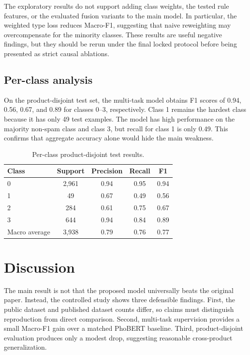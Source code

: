 \documentclass[runningheads]{llncs}
\begin{document}
The exploratory results do not support adding class weights, the tested rule features, or the evaluated fusion variants to the main model. In particular, the weighted type loss reduces Macro-F1, suggesting that naive reweighting may overcompensate for the minority classes. These results are useful negative findings, but they should be rerun under the final locked protocol before being presented as strict causal ablations.

\subsection{Per-class analysis}
On the product-disjoint test set, the multi-task model obtains F1 scores of 0.94, 0.56, 0.67, and 0.89 for classes 0--3, respectively. Class 1 remains the hardest class because it has only 49 test examples. The model has high performance on the majority non-spam class and class 3, but recall for class 1 is only 0.49. This confirms that aggregate accuracy alone would hide the main weakness.

\begin{table}[!b]
\caption{Per-class product-disjoint test results.}
\label{tab:perclass}
\centering
\small
\begin{tabularx}{0.95\linewidth}{X c c c c}
\toprule
Class & Support & Precision & Recall & F1 \\
\midrule
0 & 2,961 & 0.94 & 0.95 & 0.94 \\
1 & 49 & 0.67 & 0.49 & 0.56 \\
2 & 284 & 0.61 & 0.75 & 0.67 \\
3 & 644 & 0.94 & 0.84 & 0.89 \\
\midrule
Macro average & 3,938 & 0.79 & 0.76 & 0.77 \\
\bottomrule
\end{tabularx}
\end{table}

\section{Discussion}
The main result is not that the proposed model universally beats the original paper. Instead, the controlled study shows three defensible findings. First, the public dataset and published dataset counts differ, so claims must distinguish reproduction from direct comparison. Second, multi-task supervision provides a small Macro-F1 gain over a matched PhoBERT baseline. Third, product-disjoint evaluation produces only a modest drop, suggesting reasonable cross-product generalization.
\end{document}
